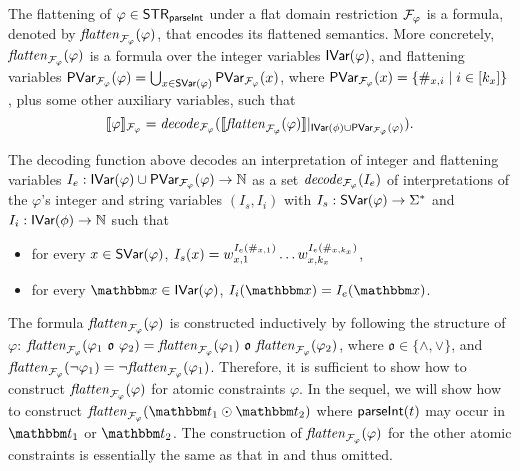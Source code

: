 The flattening of $\varphi \in {\sf STR}_{\textsf{parseInt}}$ under a flat domain restriction $\mathcal{F}_\varphi$ is a {\paexp} formula, denoted by $\mathit{flatten}_{\mathcal{F}_\varphi}(\varphi)$, that encodes its flattened semantics.
%
More concretely, $\mathit{flatten}_{\mathcal{F}_\varphi}(\varphi)$ is a formula over the integer variables $\textsf{IVar}(\varphi)$,  and flattening variables $\textsf{PVar}_{\mathcal{F}_\varphi}(\varphi) = \bigcup_{x \in \textsf{SVar}(\varphi)} \textsf{PVar}_{\mathcal{F}_\varphi}(x)$, where $\textsf{PVar}_{\mathcal{F}_\varphi}(x) = \{\#_{x,i} \mid i \in [k_x]\}$, plus some other auxiliary variables, such that 
%
$$\llbracket \varphi \rrbracket_{\mathcal{F}_\varphi} =\mathit{decode}_{\mathcal{F}_\varphi}(\llbracket \mathit{flatten}_{\mathcal{F}_\varphi}(\varphi) \rrbracket \vert_{\textsf{IVar}(\phi) \cup \textsf{PVar}_{\mathcal{F}_\varphi}(\varphi)}).$$

The decoding function above decodes an interpretation of integer and flattening variables $I_e: \textsf{IVar}(\varphi) \cup \textsf{PVar}_{\mathcal{F}_\varphi}(\varphi) \rightarrow \mathbb{N}$ as a set $\mathit{decode}_{\mathcal{F}_\varphi}(I_e)$ of interpretations of the $\varphi$'s integer and string variables $(I_s, I_i)$ with $I_s: \textsf{SVar}(\varphi) \rightarrow \Sigma^*$ and $I_i: \textsf{IVar}(\phi) \rightarrow \mathbb{N}$ such that 
\begin{itemize}
\item  
for every $ x \in \textsf{SVar}(\varphi)$, $I_s(x) = w_{x,1}^{I_e(\#_{x,1})} \ldots  w_{x,k_x}^{I_e(\#_{x,k_x})}$, 
%
\item for every $ \ivarx \in \ivar(\varphi)$, $I_i(\ivarx) = I_e(\ivarx)$.
\end{itemize}

The formula $\mathit{flatten}_{\mathcal{F}_\varphi}(\varphi)$ is constructed inductively by following the structure of $\varphi$: $\flatten_{\flatfun_\varphi}(\varphi_1\ \mathfrak{o}\ \varphi_2) = \flatten_{\flatfun_\varphi}(\varphi_1) \ \mathfrak{o}\  \flatten_{\flatfun_\varphi}(\varphi_2)$, where $\mathfrak{o} \in \{\wedge, \vee\}$, and $\mathit{flatten}_{\mathcal{F}_\varphi}(\neg \varphi_1) = \neg \mathit{flatten}_{\mathcal{F}_\varphi}(\varphi_1)$. Therefore, it is sufficient to show how to construct $\mathit{flatten}_{\mathcal{F}_\varphi}(\varphi)$ for atomic constraints $\varphi$. 
In the sequel, we will show how to construct $\flatten_{\flatfun_\varphi}(\iterm_1 \op \iterm_2)$ where $\textsf{parseInt}(t)$ may occur in $\iterm_1$ or $\iterm_2$. The construction of $\mathit{flatten}_{\mathcal{F}_\varphi}(\varphi)$ for the other atomic constraints is essentially the same as that in \cite{Parosh:20:PLDI} and thus omitted. 

